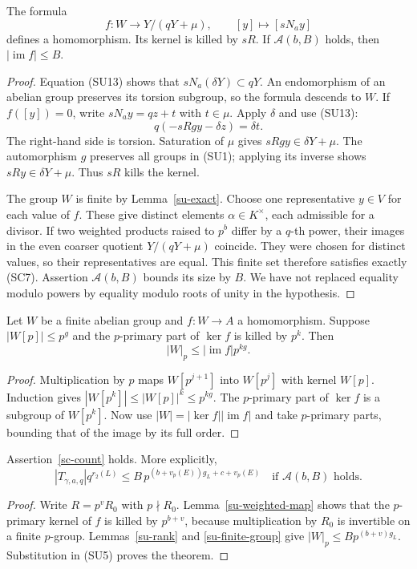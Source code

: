 \begin{lemma}\label{su-weighted-map}
The formula
\[
          f:W\longrightarrow Y/(qY+\mu),\qquad
                     [y]\longmapsto[sN_a y]
                     \tag{SU14}
\]
defines a homomorphism.  Its kernel is killed by $sR$.
If $\mathcal A(b,B)$ holds, then $|\operatorname{im}f|\le B$.
\end{lemma}
\begin{proof}
Equation (SU13) shows that $sN_a(\delta Y)\subset qY$.
An endomorphism of an abelian group preserves its torsion
subgroup, so the formula descends to $W$.
If $f([y])=0$, write $sN_a y=qz+t$ with $t\in\mu$.
Apply $\delta$ and use (SU13):
\[
                      q(-sRg y-\delta z)=\delta t.
\]
The right-hand side is torsion.  Saturation of $\mu$
gives $sRg y\in\delta Y+\mu$.
The automorphism $g$ preserves all groups in (SU1);
applying its inverse shows $sRy\in\delta Y+\mu$.
Thus $sR$ kills the kernel.

The group $W$ is finite by Lemma~\ref{su-exact}.
Choose one representative $y\in V$ for each value of $f$.
These give distinct elements $\alpha\in K^\times$, each
admissible for a divisor.  If two weighted products raised
to $p^b$ differ by a $q$-th power, their images in the
even coarser quotient $Y/(qY+\mu)$ coincide.
They were chosen for distinct values, so their
representatives are equal.  This finite set therefore
satisfies exactly (SC7).  Assertion $\mathcal A(b,B)$
bounds its size by $B$.
We have not replaced equality modulo powers by equality
modulo roots of unity in the hypothesis.
\end{proof}

\begin{lemma}\label{su-finite-group}
Let $W$ be a finite abelian group and $f:W\to A$ a
homomorphism.  Suppose $|W[p]|\le p^g$ and the
$p$-primary part of $\ker f$ is killed by $p^k$.
Then
\[
                         |W|_p\le|\operatorname{im}f|p^{kg}.
                         \tag{SU15}
\]
\end{lemma}
\begin{proof}
Multiplication by $p$ maps $W[p^{j+1}]$ into
$W[p^j]$ with kernel $W[p]$.  Induction gives
$|W[p^k]|\le|W[p]|^k\le p^{kg}$.
The $p$-primary part of $\ker f$ is a subgroup of
$W[p^k]$.  Now use $|W|=|\ker f||\operatorname{im}f|$
and take $p$-primary parts, bounding that of the image
by its full order.
\end{proof}

\begin{theorem}\label{su-count}
Assertion~\ref{sc-count} holds.  More explicitly,
\[
 |T_{\gamma,a,q}|q^{r_2(L)}
       \le B\,p^{(b+v_p(E))g_L+c+v_p(E)}
       \quad\text{if }\mathcal A(b,B)\text{ holds}.
 \tag{SU16}
\]
\end{theorem}
\begin{proof}
Write $R=p^vR_0$ with $p\nmid R_0$.
Lemma~\ref{su-weighted-map} shows that the $p$-primary
kernel of $f$ is killed by $p^{b+v}$, because
multiplication by $R_0$ is invertible on a finite
$p$-group.
Lemmas~\ref{su-rank} and \ref{su-finite-group} give
$|W|_p\le Bp^{(b+v)g_L}$.
Substitution in (SU5) proves the theorem.
\end{proof}

